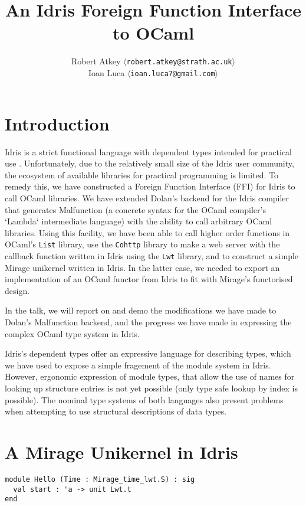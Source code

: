 \documentclass[a4paper,11pt,twocolumn]{article}
\title{An Idris Foreign Function Interface to OCaml}
\author{Robert Atkey  $\langle$\texttt{robert.atkey@strath.ac.uk}$\rangle$ \\
  Ioan Luca $\langle$\texttt{ioan.luca7@gmail.com}$\rangle$}
\date{}
\begin{document}
\maketitle

\section{Introduction}

Idris is a strict functional language with dependent types intended
for practical use \cite{idrisbook}. Unfortunately, due to the
relatively small size of the Idris user community, the ecosystem of
available libraries for practical programming is limited. To remedy
this, we have constructed a Foreign Function Interface (FFI) for Idris
to call OCaml libraries. We have extended Dolan's backend
\cite{dolan2016malfunctional} for the Idris compiler that generates
Malfunction (a concrete syntax for the OCaml compiler's `Lambda`
intermediate language) with the ability to call arbitrary OCaml
libraries. Using this facility, we have been able to call higher order
functions in OCaml's \texttt{List} library, use the \texttt{Cohttp}
library to make a web server with the callback function written in
Idris using the \texttt{Lwt} library, and to construct a simple Mirage
unikernel written in Idris. In the latter case, we needed to export an
implementation of an OCaml functor from Idris to fit with Mirage's
functorised design.

In the talk, we will report on and demo the modifications we have made
to Dolan's Malfunction backend, and the progress we have made in
expressing the complex OCaml type system in Idris.

Idris's dependent types offer an expressive language for describing
types, which we have used to expose a simple fragement of the module
system in Idris.  However, ergonomic expression of module types, that
allow the use of names for looking up structure entries is not yet
possible (only type safe lookup by index is possible). The nominal
type systems of both languages also present problems when attempting
to use structural descriptions of data types.

\section{A Mirage Unikernel in Idris}

\begin{lstlisting}
module Hello (Time : Mirage_time_lwt.S) : sig
  val start : 'a -> unit Lwt.t
end
\end{lstlisting}
\end{document}
